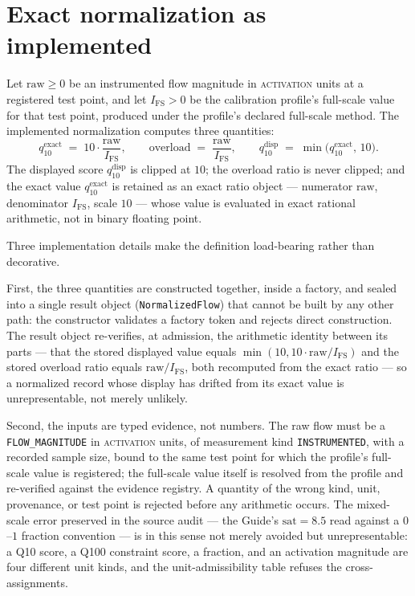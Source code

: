 \section{Exact normalization as implemented}\label{ch08:sec:exact}

\begin{definition}\label{ch08:def:formulas}
Let $\mathrm{raw} \ge 0$ be an instrumented flow magnitude in
\textsc{activation} units at a registered test point, and let
$I_{\mathrm{FS}} > 0$ be the calibration profile's full-scale value for
that test point, produced under the profile's declared full-scale method.
The implemented normalization computes three quantities:
\[
q_{10}^{\mathrm{exact}} \;=\; 10 \cdot \frac{\mathrm{raw}}{I_{\mathrm{FS}}},
\qquad
\mathrm{overload} \;=\; \frac{\mathrm{raw}}{I_{\mathrm{FS}}},
\qquad
q_{10}^{\mathrm{disp}} \;=\; \min\bigl(q_{10}^{\mathrm{exact}},\, 10\bigr).
\]
The displayed score $q_{10}^{\mathrm{disp}}$ is clipped at $10$; the
overload ratio is never clipped; and the exact value
$q_{10}^{\mathrm{exact}}$ is retained as an exact ratio object --- numerator
$\mathrm{raw}$, denominator $I_{\mathrm{FS}}$, scale $10$ --- whose value is
evaluated in exact rational arithmetic, not in binary floating point.
\end{definition}

Three implementation details make the definition load-bearing rather than
decorative.

First, the three quantities are constructed together, inside a factory, and
sealed into a single result object (\texttt{NormalizedFlow}) that cannot be
built by any other path: the constructor validates a factory token and
rejects direct construction. The result object re-verifies, at admission,
the arithmetic identity between its parts --- that the stored displayed
value equals $\min(10, 10 \cdot \mathrm{raw}/I_{\mathrm{FS}})$ and the
stored overload ratio equals $\mathrm{raw}/I_{\mathrm{FS}}$, both recomputed
from the exact ratio --- so a normalized record whose display has drifted
from its exact value is unrepresentable, not merely unlikely.

Second, the inputs are typed evidence, not numbers. The raw flow must be a
\texttt{FLOW\_MAGNITUDE} in \textsc{activation} units, of measurement kind
\texttt{INSTRUMENTED}, with a recorded sample size, bound to the same test
point for which the profile's full-scale value is registered; the
full-scale value itself is resolved from the profile and re-verified against
the evidence registry. A quantity of the wrong kind, unit, provenance, or
test point is rejected before any arithmetic occurs. The mixed-scale error
preserved in the source audit --- the Guide's $\mathrm{sat}=8.5$ read
against a $0$--$1$ fraction convention --- is in this sense not merely
avoided but unrepresentable: a Q10 score, a Q100 constraint score, a
fraction, and an activation magnitude are four different unit kinds, and
the unit-admissibility table refuses the cross-assignments.

